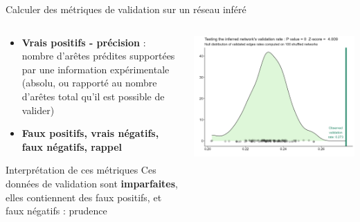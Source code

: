 \begin{frame}{Calculer des métriques de validation sur un réseau inféré}

\begin{columns}
\begin{column}{.48\textwidth}
\begin{itemize}\small
    \item \textbf{Vrais positifs - précision} : nombre d'arêtes prédites supportées par une information expérimentale (absolu, ou rapporté au nombre d'arêtes total qu'il est possible de valider)
    
    \item \textbf{Faux positifs, vrais négatifs, faux négatifs, rappel}
\end{itemize}
\begin{alertblock}{\small \danger Interprétation de ces métriques}\scriptsize
Ces données de validation sont \textbf{imparfaites}, elles contiennent des faux positifs, et faux négatifs : prudence
\end{alertblock}
\end{column}
\begin{column}{.48\textwidth}
\includegraphics[scale = 0.3]{Figures/Regression/validationtest.png}
\end{column}
\end{columns}
\end{frame}






